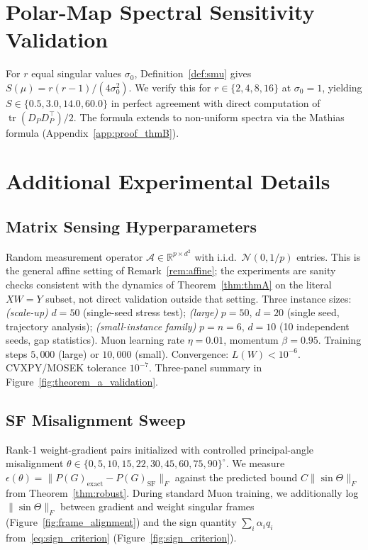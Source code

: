 \documentclass{article}
\begin{document}
\section{Polar-Map Spectral Sensitivity Validation}
\label{sec:methods:smu_validation}

For $r$ equal singular values $\sigma_0$, Definition~\ref{def:smu} gives $S(\mu) = r(r-1)/(4\sigma_0^2)$. We verify this for $r\in\{2,4,8,16\}$ at $\sigma_0=1$, yielding $S\in\{0.5, 3.0, 14.0, 60.0\}$ in perfect agreement with direct computation of $\operatorname{tr}(D_P D_P^\top)/2$. The formula extends to non-uniform spectra via the Mathias formula (Appendix~\ref{app:proof_thmB}).

\section{Additional Experimental Details}
\label{app:experiments}

\subsection{Matrix Sensing Hyperparameters}
Random measurement operator $\mathcal{A}\in\mathbb{R}^{p\times d^2}$ with i.i.d.\ $\mathcal N(0,1/p)$ entries. This is the general affine setting of Remark~\ref{rem:affine}; the experiments are sanity checks consistent with the dynamics of Theorem~\ref{thm:thmA} on the literal $XW=Y$ subset, not direct validation outside that setting. Three instance sizes: \emph{(scale-up)} $d=50$ (single-seed stress test); \emph{(large)} $p=50$, $d=20$ (single seed, trajectory analysis); \emph{(small-instance family)} $p=n=6$, $d=10$ (10 independent seeds, gap statistics). Muon learning rate $\eta=0.01$, momentum $\beta=0.95$. Training steps $5{,}000$ (large) or $10{,}000$ (small). Convergence: $L(W)<10^{-6}$. CVXPY/MOSEK tolerance $10^{-7}$. Three-panel summary in Figure~\ref{fig:theorem_a_validation}.

\subsection{\textsf{SF} Misalignment Sweep}
Rank-1 weight-gradient pairs initialized with controlled principal-angle misalignment $\theta\in\{0,5,10,15,22,30,45,60,75,90\}^\circ$. We measure $\epsilon(\theta)=\|P(G)_{\mathrm{exact}} - P(G)_{\mathrm{SF}}\|_F$ against the predicted bound $C\|\sin\Theta\|_F$ from Theorem~\ref{thm:robust}. During standard Muon training, we additionally log $\|\sin\Theta\|_F$ between gradient and weight singular frames (Figure~\ref{fig:frame_alignment}) and the sign quantity $\sum_i\alpha_i q_i$ from~\eqref{eq:sign_criterion} (Figure~\ref{fig:sign_criterion}).
\end{document}
